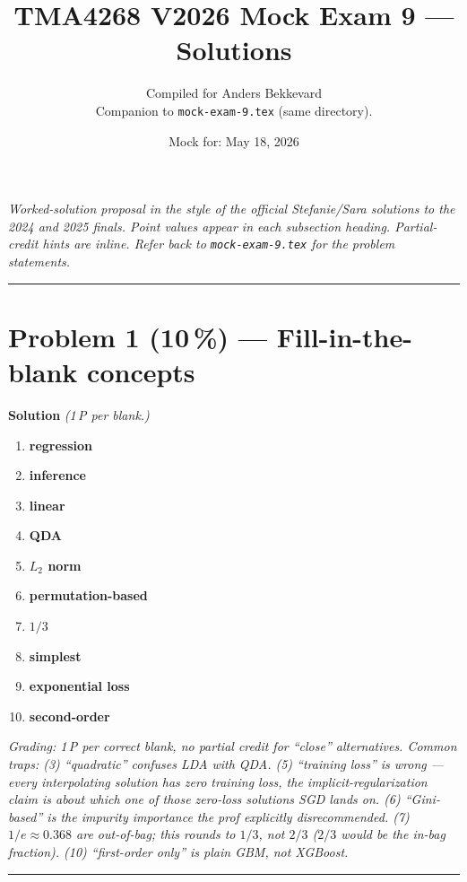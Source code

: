 \documentclass[11pt,a4paper]{article}
\title{TMA4268 V2026 Mock Exam 9 --- Solutions\\[0.3em]
\large}
\author{Compiled for Anders Bekkevard\\[0.2em]
\small Companion to \texttt{mock-exam-9.tex} (same directory).}
\date{Mock for: May 18, 2026}
\newcommand{\points}[1]{\textbf{(#1\,\%)}}
\newcommand{\sol}{\noindent\textbf{Solution}}
\begin{document}
\maketitle

\noindent\textit{Worked-solution proposal in the style of the official Stefanie/Sara solutions to the
2024 and 2025 finals. Point values appear in each subsection heading. Partial-credit hints are
inline. Refer back to \texttt{mock-exam-9.tex} for the problem statements.}

\vspace{0.6em}
\hrule
\vspace{1em}

\section*{Problem 1 \points{10} --- Fill-in-the-blank concepts}

\sol{} \emph{(1\,P per blank.)}

\begin{enumerate}[(1)]
  \item \textbf{regression}
  \item \textbf{inference}
  \item \textbf{linear}
  \item \textbf{QDA}
  \item \textbf{$L_2$ norm}
  \item \textbf{permutation-based}
  \item \textbf{$1/3$}
  \item \textbf{simplest}
  \item \textbf{exponential loss}
  \item \textbf{second-order}
\end{enumerate}

\noindent\emph{Grading: 1\,P per correct blank, no partial credit for ``close'' alternatives.
Common traps: (3) ``quadratic'' confuses LDA with QDA. (5) ``training loss'' is wrong --- every
interpolating solution has zero training loss, the implicit-regularization claim is about which one
of those zero-loss solutions SGD lands on. (6) ``Gini-based'' is the impurity importance the prof
explicitly disrecommended. (7) $1/e\approx 0.368$ are out-of-bag; this rounds to $1/3$, not $2/3$
($2/3$ would be the in-bag fraction). (10) ``first-order only'' is plain GBM, not XGBoost.}

\vspace{0.6em}
\hrule
\vspace{1em}
\end{document}
